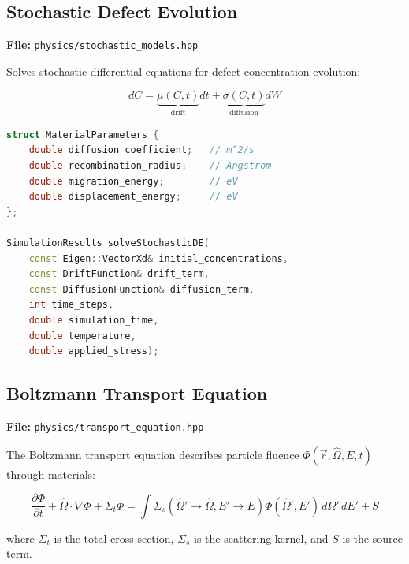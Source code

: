 \documentclass[11pt,a4paper]{article}
\begin{document}
\subsection{Stochastic Defect Evolution}

\textbf{File:} \texttt{physics/stochastic\_models.hpp}

Solves stochastic differential equations for defect concentration evolution:

\begin{equation}
dC = \underbrace{\mu(C, t)}_{\text{drift}} dt + \underbrace{\sigma(C, t)}_{\text{diffusion}} dW
\end{equation}

\begin{lstlisting}[language=C++, basicstyle=\footnotesize\ttfamily]
struct MaterialParameters {
    double diffusion_coefficient;   // m^2/s
    double recombination_radius;    // Angstrom
    double migration_energy;        // eV
    double displacement_energy;     // eV
};

SimulationResults solveStochasticDE(
    const Eigen::VectorXd& initial_concentrations,
    const DriftFunction& drift_term,
    const DiffusionFunction& diffusion_term,
    int time_steps,
    double simulation_time,
    double temperature,
    double applied_stress);
\end{lstlisting}

\subsection{Boltzmann Transport Equation}

\textbf{File:} \texttt{physics/transport\_equation.hpp}

The Boltzmann transport equation describes particle fluence $\Phi(\vec{r}, \hat{\Omega}, E, t)$ through materials:

\begin{equation}
\frac{\partial \Phi}{\partial t} + \hat{\Omega} \cdot \nabla \Phi + \Sigma_t \Phi = \int \Sigma_s(\hat{\Omega}' \to \hat{\Omega}, E' \to E) \Phi(\hat{\Omega}', E') \, d\Omega' \, dE' + S
\end{equation}

where $\Sigma_t$ is the total cross-section, $\Sigma_s$ is the scattering kernel, and $S$ is the source term.
\end{document}
